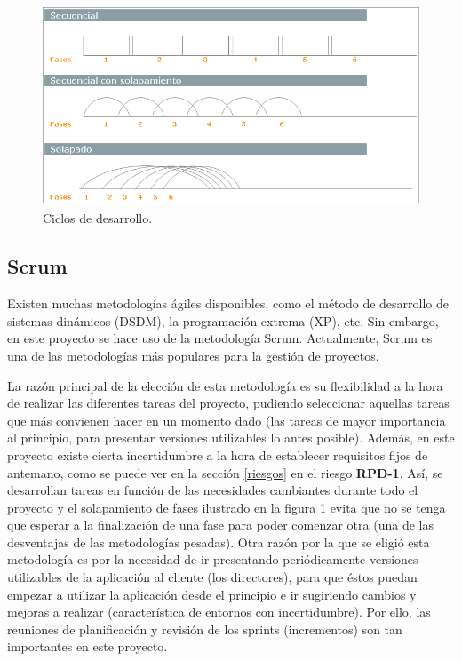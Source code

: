 \begin{figure}[t!]
\centering
\includegraphics[width=12cm,height=6cm]{figuras/ciclos_desarrollo.png}
\caption{Ciclos de desarrollo.}
\label{fig:ciclos}
\end{figure}

\subsection{Scrum} \label{scrum}
Existen muchas metodologías ágiles disponibles, como el método de desarrollo de sistemas dinámicos (DSDM), la programación extrema (XP), etc. Sin embargo, en este proyecto se hace uso de la metodología Scrum. Actualmente, Scrum es una de las metodologías más populares para la gestión de proyectos. 

La razón principal de la elección de esta metodología es su flexibilidad a la hora de realizar las diferentes tareas del proyecto, pudiendo seleccionar aquellas tareas que más convienen hacer en un momento dado (las tareas de mayor importancia al principio, para presentar versiones utilizables lo antes posible). Además, en este proyecto existe cierta incertidumbre a la hora de establecer requisitos fijos de antemano, como se puede ver en la sección \ref{riesgos} en el riesgo \textbf{RPD-1}. Así, se desarrollan tareas en función de las necesidades cambiantes durante todo el proyecto y el solapamiento de fases ilustrado en la figura \ref{fig:ciclos} evita que no se tenga que esperar a la finalización de una fase para poder comenzar otra (una de las desventajas de las metodologías pesadas). Otra razón por la que se eligió esta metodología es por la necesidad de ir presentando periódicamente versiones utilizables de la aplicación al cliente (los directores), para que éstos puedan empezar a utilizar la aplicación desde el principio e ir sugiriendo cambios y mejoras a realizar (característica de entornos con incertidumbre). Por ello, las reuniones de planificación y revisión de los sprints (incrementos) son tan importantes en este proyecto.

